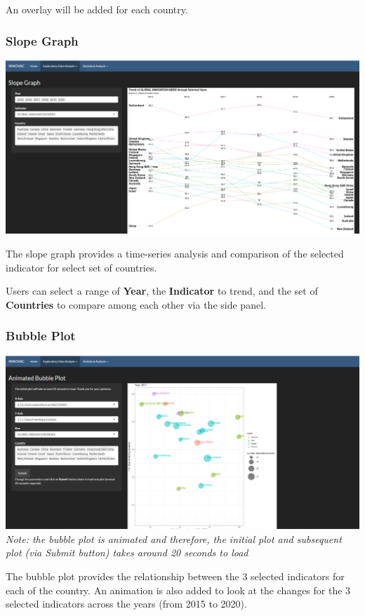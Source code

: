 \documentclass[
]{article}
\begin{document}
An overlay will be added for each country.

\hypertarget{slope-graph}{%
\subsubsection{Slope Graph}\label{slope-graph}}

\includegraphics{./images/slope.png}

The slope graph provides a time-series analysis and comparison of the
selected indicator for select set of countries.

Users can select a range of \textbf{Year}, the \textbf{Indicator} to
trend, and the set of \textbf{Countries} to compare among each other via
the side panel.

\hypertarget{bubble-plot}{%
\subsubsection{Bubble Plot}\label{bubble-plot}}

\includegraphics{./images/bubble.png} \emph{Note: the bubble plot is
animated and therefore, the initial plot and subsequent plot (via Submit
button) takes around 20 seconds to load}

The bubble plot provides the relationship between the 3 selected
indicators for each of the country. An animation is also added to look
at the changes for the 3 selected indicators across the years (from 2015
to 2020).
\end{document}
